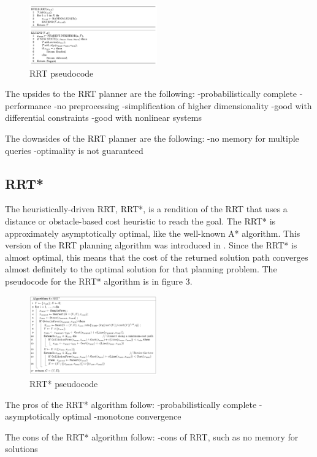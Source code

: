 \documentclass[conference]{IEEEtran} \usepackage[T1]{fontenc} \usepackage[backend=biber, style=ieee]{biblatex}
\begin{document}
\begin{figure}
\label{figure2} 
\centering 
\includegraphics[width=0.49\textwidth]{rrt}
\caption{RRT pseudocode}
\end{figure}

The upsides to the RRT planner are the following:
-probabilistically complete
-performance
-no preprocessing
-simplification of higher dimensionality
-good with differential constraints
-good with nonlinear systems

The downsides of the RRT planner are the following:
-no memory for multiple queries
-optimality is not guaranteed

\subsection{RRT*} \label{RRT*}
The heuristically-driven RRT, RRT*, is a rendition of the RRT that uses a distance or obstacle-based cost heuristic to reach the goal. The RRT* is approximately 
asymptotically optimal, like the well-known A* algorithm. This version of the RRT planning algorithm was introduced in \cite{sampling_star}. Since the RRT* is almost
optimal, this means that the cost of the returned solution path converges almost definitely to the optimal solution for that planning problem. The pseudocode for the
RRT* algorithm is in figure 3.

\begin{figure}
\label{figure3} 
\centering 
\includegraphics[width=0.49\textwidth]{rrt_star}
\caption{RRT* pseudocode}
\end{figure}

The pros of the RRT* algorithm follow:
-probabilistically complete
-asymptotically optimal
-monotone convergence

The cons of the RRT* algorithm follow:
-cons of RRT, such as no memory for solutions
\end{document}
